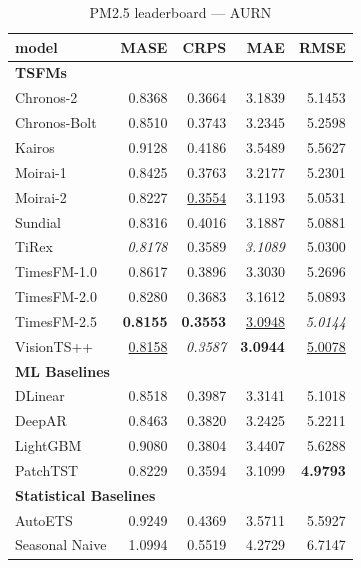 \begin{table}[H]
\caption{PM2.5 leaderboard --- AURN}
\centering
\begin{small}
\begin{tabular}{lrrrr}
\toprule
model & MASE & CRPS & MAE & RMSE \\
\midrule
\multicolumn{5}{l}{\textbf{TSFMs}} \\
Chronos-2 & 0.8368 & 0.3664 & 3.1839 & 5.1453 \\
Chronos-Bolt & 0.8510 & 0.3743 & 3.2345 & 5.2598 \\
Kairos & 0.9128 & 0.4186 & 3.5489 & 5.5627 \\
Moirai-1 & 0.8425 & 0.3763 & 3.2177 & 5.2301 \\
Moirai-2 & 0.8227 & \underline{0.3554} & 3.1193 & 5.0531 \\
Sundial & 0.8316 & 0.4016 & 3.1887 & 5.0881 \\
TiRex & \textit{0.8178} & 0.3589 & \textit{3.1089} & 5.0300 \\
TimesFM-1.0 & 0.8617 & 0.3896 & 3.3030 & 5.2696 \\
TimesFM-2.0 & 0.8280 & 0.3683 & 3.1612 & 5.0893 \\
TimesFM-2.5 & \textbf{0.8155} & \textbf{0.3553} & \underline{3.0948} & \textit{5.0144} \\
VisionTS++ & \underline{0.8158} & \textit{0.3587} & \textbf{3.0944} & \underline{5.0078} \\
\midrule
\multicolumn{5}{l}{\textbf{ML Baselines}} \\
DLinear & 0.8518 & 0.3987 & 3.3141 & 5.1018 \\
DeepAR & 0.8463 & 0.3820 & 3.2425 & 5.2211 \\
LightGBM & 0.9080 & 0.3804 & 3.4407 & 5.6288 \\
PatchTST & 0.8229 & 0.3594 & 3.1099 & \textbf{4.9793} \\
\midrule
\multicolumn{5}{l}{\textbf{Statistical Baselines}} \\
AutoETS & 0.9249 & 0.4369 & 3.5711 & 5.5927 \\
Seasonal Naive & 1.0994 & 0.5519 & 4.2729 & 6.7147 \\
\bottomrule
\end{tabular}
\end{small}
\end{table}